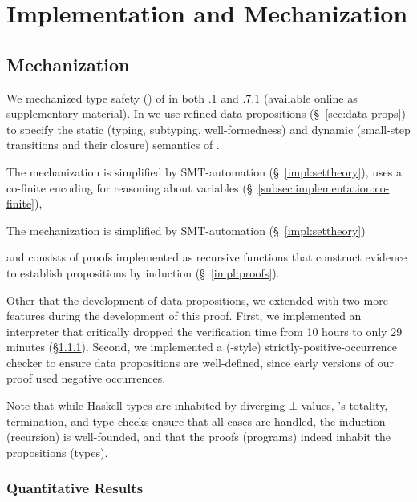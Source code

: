 \chapter{Implementation and Mechanization}
\label{ch:implementation}

\section{\lh Mechanization}
\label{sec:implementation:lh}

We mechanized type safety () 
of \sysrf in both .1 and .7.1
(available online as supplementary
material).
%
In \lh we use refined data propositions 
(\S~\ref{sec:data-props}) to specify the
static (\eg typing, subtyping, well-formedness)
and dynamic (\ie small-step transitions and their closure)
semantics of \sysrf.
%
\begin{fullversion}
  The \lh mechanization is simplified by 
  SMT-automation (\S~\ref{impl:settheory}),
  uses a co-finite encoding for reasoning about
  variables (\S~\ref{subsec:implementation:co-finite}),
\end{fullversion}
\begin{conference}
  The \lh mechanization is simplified by 
  SMT-automation (\S~\ref{impl:settheory})
\end{conference}
and consists of proofs implemented as recursive functions that
construct  evidence to establish propositions by
induction (\S~\ref{impl:proofs}).
%


  Other that the development of data propositions, we extended \lh 
  with two more features during the development of this proof. 
  First, we implemented an interpreter that 
  critically dropped the verification time from 10 hours 
  to only 29 minutes (\S\ref{subsec:quantitiative}). 
  Second, we implemented a (\coq-style) strictly-positive-occurrence checker
  to ensure data propositions are well-defined, 
  since early versions of our proof used negative occurrences. 

%
Note that while Haskell types are inhabited
by diverging $\bot$ values, \lh's totality,
termination, and type checks ensure that all
cases are handled, the induction (recursion)
is well-founded, and that the proofs (programs)
indeed inhabit the propositions (types).



\subsection{Quantitative Results}
\label{subsec:quantitiative}

